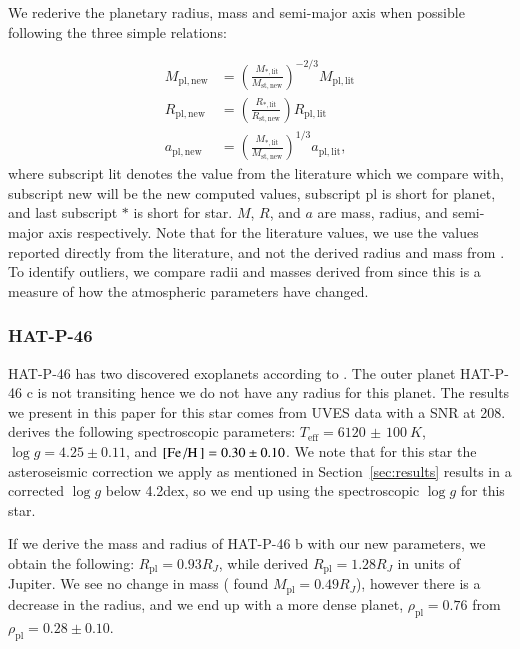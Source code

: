 \documentclass{aa}
\begin{document}
We rederive the planetary radius, mass and semi-major axis when possible
following the three simple relations:

\begin{align}
    M_\mathrm{pl,new} &= \left(\frac{M_\mathrm{\ast,lit}}{M_\mathrm{st,new}}\right)^{-2/3} M_\mathrm{pl,lit}  \\
    R_\mathrm{pl,new} &= \left(\frac{R_\mathrm{\ast,lit}}{R_\mathrm{st,new}}\right) R_\mathrm{pl,lit} \\
    a_\mathrm{pl,new} &= \left(\frac{M_\mathrm{\ast,lit}}{M_\mathrm{st,new}}\right)^{1/3} a_\mathrm{pl,lit},
\end{align}
where subscript lit denotes the value from the literature which we compare with,
subscript new will be the new computed values, subscript pl is short for planet,
and last subscript $\ast$ is short for star. $M$, $R$, and $a$ are mass, radius,
and semi-major axis respectively. Note that for the literature values, we use
the values reported directly from the literature, and not the derived radius and
mass from \citet{Torres2010}. To identify outliers, we compare radii and masses
derived from \citet{Torres2010} since this is a measure of how the atmospheric
parameters have changed.

\subsubsection{HAT-P-46}
\label{sub:HAT-P-46}
HAT-P-46 has two discovered exoplanets according to \citet{Hartmann2014}. The
outer planet HAT-P-46 c is not transiting hence we do not have any radius for
this planet. The results we present in this paper for this star comes from UVES
data with a SNR at 208. \citet{Hartmann2014} derives the following spectroscopic
parameters: $T_\mathrm{eff}=\SI{6120(100)}{K}$, $\log g=4.25\pm0.11$, and
$[\ion{Fe}/\ion{H}]=0.30\pm0.10$. We note that for this star the asteroseismic
correction we apply as mentioned in Section~\ref{sec:results} results in a
corrected $\log g$ below 4.2dex, so we end up using the spectroscopic $\log g$
for this star.

If we derive the mass and radius of HAT-P-46 b with our new parameters, we
obtain the following: $R_\mathrm{pl} = 0.93R_J$, while \citet{Hartmann2014}
derived $R_\mathrm{pl} = 1.28R_J$ in units of Jupiter. We see no change in mass
(\citet{Hartmann2014} found $M_\mathrm{pl}=0.49R_J$), however there is a
decrease in the radius, and we end up with a more dense planet,
$\rho_\mathrm{pl}=0.76$ from $\rho_\mathrm{pl}=0.28\pm0.10$.
\end{document}
